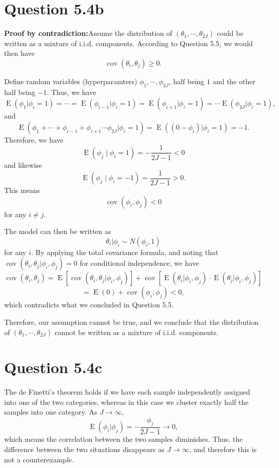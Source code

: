 \documentclass{article}
\DeclareMathOperator*{\cov}{cov}
\DeclareMathOperator*{\expec}{E}
\begin{document}
\section*{Question 5.4b}
{
    \textbf{Proof by contradiction:}\quad Assume the distribution of $(\theta_1, \cdots, \theta_{2J})$ could be written as a mixture of i.i.d. components. According to Question 5.5, we would then have $$\cov{(\theta_i, \theta_j)} \geq 0.$$

    Define random variables (hyperparamters) $\phi_1, \cdots, \phi_{2J}$, half being $1$ and the other half being $-1$. Thus, we have 
    $$\expec{(\phi_1 | \phi_i=1)} = \cdots = \expec{(\phi_{i-1} | \phi_i=1)} = \expec{(\phi_{i+1} | \phi_i=1)} = \cdots \expec{(\phi_{2J} | \phi_i=1)},$$
    and
    $$\expec{(\phi_1 + \cdots + \phi_{i-1} + \phi_{i+1} \cdots \phi_{2J} | \phi_i=1)} = \expec{((0 - \phi_i) | \phi_i=1)} = -1.$$
    Therefore, we have $$\expec{(\phi_j \mid \phi_i=1)} = -\frac{1}{2J-1} < 0$$ and likewise $$\expec{(\phi_j \mid \phi_i=-1)} = \frac{1}{2J-1} > 0.$$ This means $$\cov{(\phi_i, \phi_j)} < 0$$ for any $i \neq j$.
    
    The model can then be written as $$\theta_i | \phi_i \sim N(\phi_i, 1)$$ for any $i$. By applying the total covariance formula, and noting that $\cov{(\theta_i, \theta_j | \phi_i, \phi_j)} = 0$ for conditional independence, we have
    $$\cov{(\theta_i, \theta_j)} = \expec{\left[ \cov{(\theta_i, \theta_j | \phi_i, \phi_j)} \right]} + \cov{\left[ \expec{(\theta_i | \phi_i, \phi_j)} \cdot \expec{(\theta_j | \phi_i, \phi_j)}\right]}$$
    $$= \expec{(0)} + \cov{( \phi_i, \phi_j )} < 0, $$ which contradicts what we concluded in Question 5.5.

    Therefore, our assumption cannot be true, and we conclude that the distribution of $(\theta_1, \cdots, \theta_{2J})$ cannot be written as a mixture of i.i.d. components.
}

\section*{Question 5.4c}
{
    The de Finetti's theorem holds if we have each sample independently assigned into one of the two categories, whereas in this case we cluster exactly half the samples into one category. As $J \rightarrow \infty$, 
    $$\expec{(\phi_i | \phi_j)} = -\frac{\phi_j}{2J-1} \rightarrow 0,$$ which means the correlation between the two samples diminishes. Thus, the difference between the two situations disappears as $J \rightarrow \infty$, and therefore this is not a counterexample.
}


\clearpage
\end{document}

